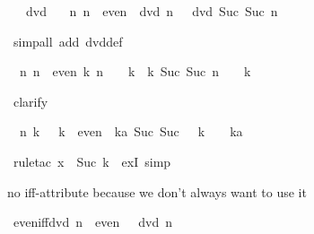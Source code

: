 \begin{isabellebody}
%
\begin{isamarkuptxt}%
\begin{isabelle}%
\ {}{\isachardot}\ {}\ dvd\ {}\isanewline
\ {}{\isachardot}\ {\isasymAnd}n{\isachardot}\ {\isasymlbrakk}n\ {\isasymin}\ even{\isacharsemicolon}\ {}\ dvd\ n{\isasymrbrakk}\ {\isasymLongrightarrow}\ {}\ dvd\ Suc\ {\isacharparenleft}Suc\ n{\isacharparenright}%
\end{isabelle}%
\end{isamarkuptxt}%
\isamarkuptrue%
\ {\isacharparenleft}simp{\isacharunderscore}all\ add{\isacharcolon}\ dvd{\isacharunderscore}def{\isacharparenright}\isamarkupfalse%
%
\begin{isamarkuptxt}%
\begin{isabelle}%
\ {}{\isachardot}\ {\isasymAnd}n{\isachardot}\ {\isasymlbrakk}n\ {\isasymin}\ even{\isacharsemicolon}\ {\isasymexists}k{\isachardot}\ n\ {\isacharequal}\ {}\ {\isacharasterisk}\ k{\isasymrbrakk}\ {\isasymLongrightarrow}\ {\isasymexists}k{\isachardot}\ Suc\ {\isacharparenleft}Suc\ n{\isacharparenright}\ {\isacharequal}\ {}\ {\isacharasterisk}\ k%
\end{isabelle}%
\end{isamarkuptxt}%
\isamarkuptrue%
\ clarify\isamarkupfalse%
%
\begin{isamarkuptxt}%
\begin{isabelle}%
\ {}{\isachardot}\ {\isasymAnd}n\ k{\isachardot}\ {}\ {\isacharasterisk}\ k\ {\isasymin}\ even\ {\isasymLongrightarrow}\ {\isasymexists}ka{\isachardot}\ Suc\ {\isacharparenleft}Suc\ {\isacharparenleft}{}\ {\isacharasterisk}\ k{\isacharparenright}{\isacharparenright}\ {\isacharequal}\ {}\ {\isacharasterisk}\ ka%
\end{isabelle}%
\end{isamarkuptxt}%
\isamarkuptrue%
\ {\isacharparenleft}rule{\isacharunderscore}tac\ x\ {\isacharequal}\ {\isachardoublequote}Suc\ k{\isachardoublequote}\ \ exI{\isacharcomma}\ simp{\isacharparenright}\isanewline
\isamarkupfalse%
\isamarkupfalse%
%
\begin{isamarkuptext}%
no iff-attribute because we don't always want to use it%
\end{isamarkuptext}%
\isamarkuptrue%
\ even{\isacharunderscore}iff{\isacharunderscore}dvd{\isacharcolon}\ {\isachardoublequote}{\isacharparenleft}n\ {\isasymin}\ even{\isacharparenright}\ {\isacharequal}\ {\isacharparenleft}{}\ dvd\ n{\isacharparenright}{\isachardoublequote}\isanewline

\end{isabellebody}
